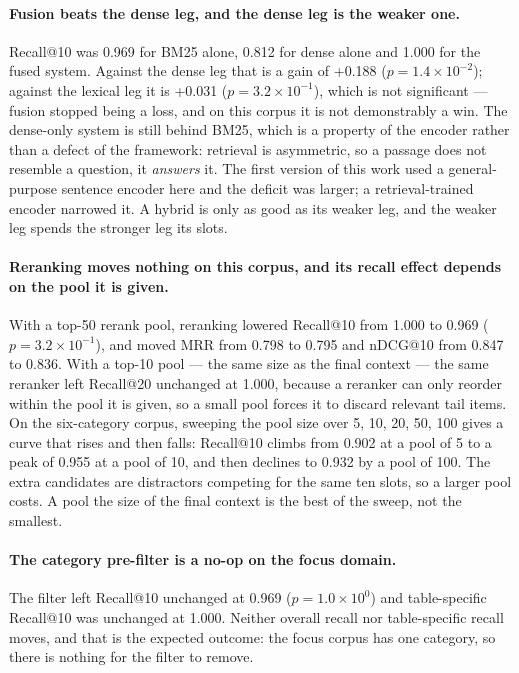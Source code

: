 \documentclass[conference]{IEEEtran}
\begin{document}
\paragraph{Fusion beats the dense leg, and the dense leg is the weaker one.}
Recall@10 was 0.969 for BM25 alone, 0.812 for dense
alone and 1.000 for the fused system. Against the dense leg that
is a gain of +0.188 ($p=1.4\!\times\!10^{-2}$); against the lexical leg it is
+0.031 ($p=3.2\!\times\!10^{-1}$), which is not significant --- fusion stopped
being a loss, and on this corpus it is not demonstrably a win.
The dense-only system is still behind BM25, which is a property of the encoder rather than a defect of the framework: retrieval is asymmetric, so a passage does not resemble a question, it \emph{answers} it. The first version of this work used a general-purpose sentence encoder here and the deficit was larger; a retrieval-trained encoder narrowed it. A hybrid is only as good as its weaker leg, and the weaker leg spends the stronger leg its slots.

\paragraph{Reranking moves nothing on this corpus, and its recall effect depends on the pool it is given.}
With a top-50 rerank pool, reranking lowered Recall@10 from 1.000 to 0.969 ($p=3.2\!\times\!10^{-1}$),
and moved MRR from 0.798 to 0.795 and nDCG@10 from
0.847 to 0.836. With a top-10 pool --- the same size as
the final context --- the same reranker left Recall@20 unchanged at 1.000, because a reranker can only
reorder within the pool it is given, so a small pool forces it to discard
relevant tail items. On the six-category corpus, sweeping the pool size over 5, 10, 20, 50, 100 gives a curve that rises and then falls: Recall@10 climbs from 0.902 at a pool of 5 to a peak of 0.955 at a pool of 10, and then declines to 0.932 by a pool of 100. The extra candidates are distractors competing for the same ten slots, so a larger pool costs. A pool the size of the final context is the best of the sweep, not the smallest.

\paragraph{The category pre-filter is a no-op on the focus domain.} The filter left Recall@10 unchanged at 0.969 ($p=1.0\!\times\!10^{0}$)
and table-specific Recall@10 was unchanged at 1.000. Neither overall recall nor table-specific recall moves, and that is the expected outcome: the focus corpus has one category, so there is nothing for the filter to remove.
\end{document}
